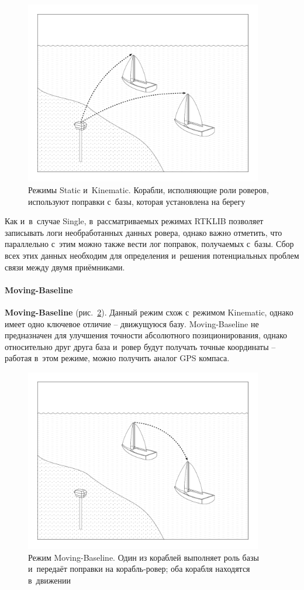 \begin{figure}[h!]
  \centering
  \setlength{\fboxsep}{5pt}
  \includegraphics[height=8cm]{img/tikz/rtk-static-kinematic/pic}
  \caption{Режимы Static и~Kinematic. Корабли, исполняющие роли роверов, используют поправки с~базы, которая установлена на берегу}\label{fig:rtk-static-kinematic}
\end{figure}

Как и~в~случае Single, в~рассматриваемых режимах RTKLIB позволяет записывать логи необработанных данных ровера, однако важно отметить, что параллельно с~этим можно также вести лог поправок, получаемых с~базы. Сбор всех этих данных необходим для определения и~решения потенциальных проблем связи между двумя приёмниками.

\paragraph{Moving-Baseline}

\textbf{Moving-Baseline} (рис.~\ref{fig:rtk-moving-baseline}). Данный режим схож с~режимом Kinematic, однако имеет одно ключевое отличие -- движущуюся базу. Moving-Baseline не предназначен для улучшения точности абсолютного позиционирования, однако относительно друг друга база и~ровер будут получать точные координаты -- работая в~этом режиме, можно получить аналог GPS компаса.

\begin{figure}[h!]
  \centering
  \setlength{\fboxsep}{5pt}
  \includegraphics[height=8cm]{img/tikz/rtk-moving-baseline/pic}
  \caption{Режим Moving-Baseline. Один из кораблей выполняет роль базы и~передаёт поправки на корабль-ровер; оба корабля находятся в~движении}\label{fig:rtk-moving-baseline}
\end{figure}

